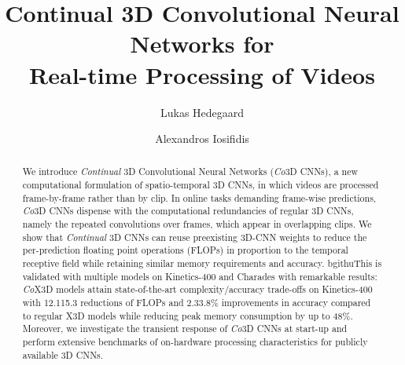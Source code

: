 \documentclass[runningheads]{llncs}
\begin{document}
\pagestyle{headings}
\mainmatter
\def\ECCVSubNumber{5612}  

\title{Continual 3D Convolutional Neural Networks for \\ Real-time Processing of Videos} 

\begin{comment}
\titlerunning{ECCV-22 submission ID \ECCVSubNumber} 
\authorrunning{ECCV-22 submission ID \ECCVSubNumber} 
\author{Anonymous ECCV submission}
\institute{Paper ID \ECCVSubNumber}
\end{comment}


\author{Lukas Hedegaard\and
Alexandros Iosifidis}
\maketitle

\begin{abstract}

We introduce \textit{Continual} 3D Convolutional Neural Networks (\textit{Co}3D CNNs), a new computational formulation of spatio-temporal 3D CNNs, in which videos are processed frame-by-frame rather than by clip.
In online tasks demanding frame-wise predictions, \textit{Co}3D CNNs dispense with the computational redundancies of regular 3D CNNs, namely the repeated convolutions over frames, which appear in overlapping clips.
We show that \textit{Continual} 3D CNNs can reuse preexisting 3D-CNN weights to reduce the per-prediction floating point operations (FLOPs) in proportion to the temporal receptive field while retaining similar memory requirements and accuracy.
bgithuThis is validated with multiple models on \mbox{Kinetics-400} and Charades with remarkable results: \textit{Co}X3D models attain state-of-the-art complexity/accuracy trade-offs on \mbox{Kinetics-400} with 12.115.3 reductions of FLOPs and 2.33.8\% improvements in accuracy compared to regular X3D models while reducing peak memory consumption by up to 48\%. 
Moreover, we investigate the transient response of \textit{Co}3D CNNs at start-up
and perform extensive benchmarks of on-hardware processing characteristics for publicly available 3D CNNs.



\end{abstract}
\end{document}
